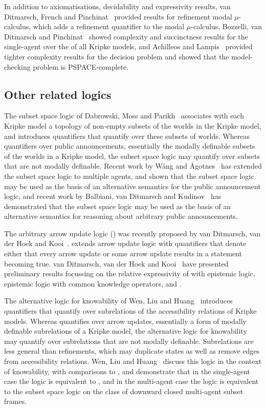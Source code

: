 In addition to axiomatisations, decidability and expressivity results, van Ditmarsch, French and Pinchinat~\cite{vanditmarsch:2010} provided results for refinement modal $\mu$-calculus, which adds a refinement quantifier to the modal $\mu$-calculus, Bozzelli, van Ditmarsch and Pinchinat~\cite{bozzelli:2014a} showed complexity and succinctness results for the single-agent \logicRml{} over the \classK{} of all Kripke models, and Achilleos and Lampis~\cite{achilleos:2013} provided tighter complexity results for the decision problem and showed that the model-checking problem is PSPACE-complete.

\subsection{Other related logics}

The subset space logic of Dabrowski, Moss and Parikh~\cite{dabrowski:1996} associates with each Kripke model a topology of non-empty subsets of the worlds in the Kripke model, and introduces quantifiers that quantify over these subsets of worlds.
Whereas \logicApal{} quantifiers over public announcements, essentially the modally definable subsets of the worlds in a Kripke model, the subset space logic may quantify over subsets that are not modally definable.
Recent work by W{\'a}ng and {\AA}gotnes~\cite{wang:2013a,wang:2013b} has extended the subset space logic to multiple agents, and shown that the subset space logic may be used as the basis of an alternative semantics for the public announcement logic, and recent work by Balbiani, van Ditmarsch and Kudinov~\cite{balbiani:2013} has demonstrated that the subset space logic may be used as the basis of an alternative semantics for reasoning about arbitrary public announcements.

The arbitrary arrow update logic (\logicAaul{}) was recently proposed by van Ditmarsch, van der Hoek and Kooi~\cite{vanditmarsch:2014}.
\logicAaul{} extends arrow update logic with quantifiers that denote either that every arrow update or some arrow update results in a statement becoming true. 
van Ditmarsch, van der Hoek and Kooi~\cite{vanditmarsch:2014} have presented preliminary results focussing on the relative expressivity of \logicAaul{} with epistemic logic, epistemic logic with common knowledge operators, and \logicApal{}.

The alternative logic for knowability of Wen, Liu and Huang~\cite{wen:2011} introduces quantifiers that quantify over subrelations of the accessibility relations of Kripke models.
Whereas \logicAaul{} quantifies over arrow updates, essentially a form of modally definable subrelations of a Kripke model, the alternative logic for knowability may quantify over subrelations that are not modally definable.
Subrelations are less general than refinements, which may duplicate states as well as remove edges from accessibility relations.
Wen, Liu and Huang~\cite{wen:2011} discuss this logic in the context of knowability, with comparisons to \logicApal{}, and demonstrate that in the single-agent case the logic is equivalent to \logicApal{}, and in the multi-agent case the logic is equivalent to the subset space logic on the class of downward closed multi-agent subset frames.
